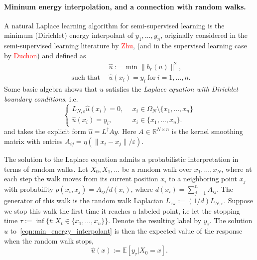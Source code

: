 \documentclass{article}
\newcommand{\Reals}{\mathbb{R}}
\newcommand{\1}{\mathbf{1}}
\newcommand{\Ebb}{\mathbb{E}}
\newcommand{\wh}[1]{\widehat{#1}}
\theoremstyle{definition}
\theoremstyle{remark}
\begin{document}
\paragraph{Mininum energy interpolation, and a connection with random walks.}

A natural Laplace learning algorithm for semi-supervised learning is the minimum (Dirichlet) energy interpolant of $y_1,\ldots,y_n$, originally considered in the semi-supervised learning literature by \textcolor{red}{Zhu}, (and in the supervised learning case by \textcolor{red}{Duchon}) and defined as 
\begin{equation}
\label{eqn:min_energy_interpolant}
\begin{aligned}
& \wh{u} := \min \|b_r(u)\|^2, \\
~~\textrm{such that}~~ &\wh{u}(x_i) = y_i ~\textrm{for}~ i = 1,\ldots,n.
\end{aligned}
\end{equation}
Some basic algebra shows that ${u}$ satisfies the \emph{Laplace equation with Dirichlet boundary conditions}, i.e. 
\begin{equation}
\label{eqn:laplace_equation}
\begin{cases}
L_{N,\varepsilon}{\wh{u}}(x_i) = 0,& ~~\textrm{$x_i \in \Omega_N \setminus \{x_1,\ldots,x_n\}$} \\
\wh{u}(x_i) = y_i,&~~\textrm{$x_i \in \{x_1,\ldots,x_n\}$.}
\end{cases}
\end{equation}
and takes the explicit form $\wh{u} = L^{\dagger} A y$. Here $A \in \Reals^{N \times n}$ is the kernel smoothing matrix with entries $A_{ij} = \eta(\|x_i - x_j\| / \varepsilon)$.

The solution to the Laplace equation admits a probabilistic interpretation in terms of random walks. Let $X_0,X_1,\ldots$ be a random walk over $x_1,\ldots,x_N$, where at each step the walk moves from its current position $x_i$ to a neighboring point $x_j$ with probability $p(x_i,x_j) = A_{ij}/d(x_i)$, where $d(x_i) = \sum_{j = 1}^{n} A_{ij}$. The generator of this walk is the random walk Laplacian $L_{\mathrm{rw}} := (1/d) L_{N,\varepsilon}$. Suppose we stop this walk the first time it reaches a labeled point, i.e let the stopping time $\tau := \inf\{t: X_t \in \{x_1,\ldots,x_n\}\}$. Denote the resulting label by $y_{\tau}$. The solution $\wh{u}$ to~\eqref{eqn:min_energy_interpolant} is then the expected value of the response when the random walk stops,
\begin{equation}
\label{eqn:random_walk_interpretation_laplace_learning}
\wh{u}(x) := \Ebb[y_{\tau}|X_0 = x].
\end{equation}
\end{document}
